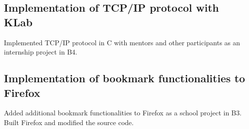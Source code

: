 \documentclass[10pt]{article}
\begin{document}
  \subsection*{Implementation of TCP/IP protocol with KLab}
    Implemented TCP/IP protocol in C with mentors and other participants as an internship project in B4.
  \subsection*{Implementation of bookmark functionalities to Firefox}
    Added additional bookmark functionalities to Firefox as a school project in B3.
    \\
    Built Firefox and modified the source code.
\end{document}
